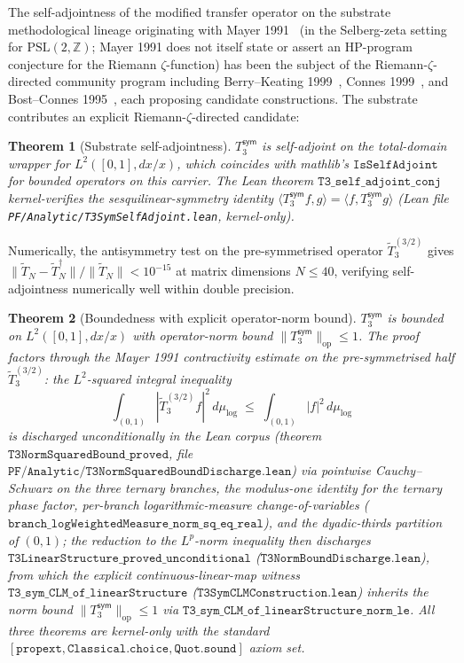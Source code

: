 \documentclass[11pt,a4paper]{amsart}
\theoremstyle{plain}
\newtheorem{theorem}{Theorem}[section]
\theoremstyle{definition}
\newcommand{\Tsym}{T_3^{\textsf{sym}}}
\begin{document}
The self-adjointness of the modified transfer operator on the substrate methodological lineage originating with Mayer 1991~\cite{mayer1991} (in the Selberg-zeta setting for $\mathrm{PSL}(2,\mathbb{Z})$; Mayer 1991 does not itself state or assert an HP-program conjecture for the Riemann $\zeta$-function) has been the subject of the Riemann-$\zeta$-directed community program including Berry--Keating 1999~\cite{berry-keating1999}, Connes 1999~\cite{connes1999}, and Bost--Connes 1995~\cite{bost-connes1995}, each proposing candidate constructions. The substrate contributes an explicit Riemann-$\zeta$-directed candidate:

\begin{theorem}[Substrate self-adjointness]\label{thm:t3sym-self-adjoint}
$\Tsym$ is self-adjoint on the total-domain wrapper for $L^{2}([0,1], dx/x)$, which coincides with mathlib's $\texttt{IsSelfAdjoint}$ for bounded operators on this carrier. The Lean theorem $\texttt{T3\_self\_adjoint\_conj}$ kernel-verifies the sesquilinear-symmetry identity $\langle \Tsym f, g \rangle = \langle f, \Tsym g \rangle$ (Lean file \texttt{PF/Analytic/T3SymSelfAdjoint.lean}, kernel-only).
\end{theorem}

Numerically, the antisymmetry test on the pre-symmetrised operator $\widetilde{T}_{3}^{(3/2)}$ gives $\|\widetilde{T}_{N} - \widetilde{T}_{N}^{\dagger}\|/\|\widetilde{T}_{N}\| < 10^{-15}$ at matrix dimensions $N \le 40$, verifying self-adjointness numerically well within double precision.

\begin{theorem}[Boundedness with explicit operator-norm bound]\label{thm:t3sym-bounded}
$\Tsym$ is bounded on $L^{2}([0,1], dx/x)$ with operator-norm bound $\|\Tsym\|_{\mathrm{op}} \le 1$. The proof factors through the Mayer 1991 contractivity estimate on the pre-symmetrised half $\widetilde{T}_{3}^{(3/2)}$: the $L^{2}$-squared integral inequality
\[
\int_{(0,1)} |\widetilde{T}_{3}^{(3/2)} f|^{2}\, d\mu_{\log} \;\le\; \int_{(0,1)} |f|^{2}\, d\mu_{\log}
\]
is discharged unconditionally in the Lean corpus (theorem $\texttt{T3NormSquaredBound\_proved}$, file $\texttt{PF/Analytic/T3NormSquaredBoundDischarge.lean}$) via pointwise Cauchy--Schwarz on the three ternary branches, the modulus-one identity for the ternary phase factor, per-branch logarithmic-measure change-of-variables ($\texttt{branch\_logWeightedMeasure\_norm\_sq\_eq\_real}$), and the dyadic-thirds partition of $(0,1)$; the reduction to the $L^{p}$-norm inequality then discharges $\texttt{T3LinearStructure\_proved\_unconditional}$ ($\texttt{T3NormBoundDischarge.lean}$), from which the explicit continuous-linear-map witness $\texttt{T3\_sym\_CLM\_of\_linearStructure}$ ($\texttt{T3SymCLMConstruction.lean}$) inherits the norm bound $\|\Tsym\|_{\mathrm{op}} \le 1$ via $\texttt{T3\_sym\_CLM\_of\_linearStructure\_norm\_le}$. All three theorems are kernel-only with the standard $[\texttt{propext}, \texttt{Classical.choice}, \texttt{Quot.sound}]$ axiom set.
\end{theorem}
\end{document}
